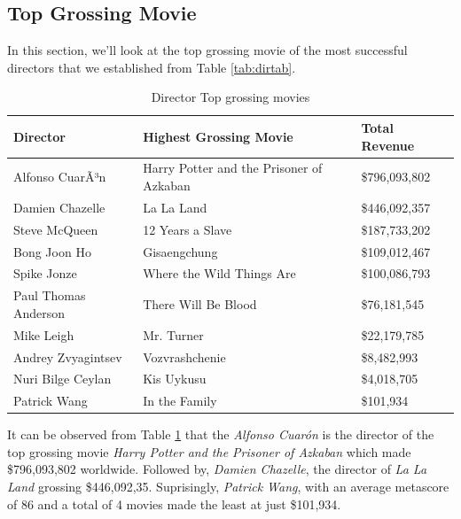 \documentclass[11pt,a4paper,]{article}
\begin{document}
\hypertarget{top-grossing-movie}{%
\subsection{Top Grossing Movie}\label{top-grossing-movie}}

In this section, we'll look at the top grossing movie of the most successful directors that we established from Table \ref{tab:dirtab}.

\begin{table}[!h]

\caption{\label{tab:dirtab2}Director Top grossing movies}
\centering
\begin{tabular}[t]{l|l|l}
\hline
Director & Highest Grossing Movie & Total Revenue\\
\hline
\rowcolor{gray!6}  Alfonso CuarÃ³n & Harry Potter and the Prisoner of Azkaban & \$796,093,802\\
\hline
Damien Chazelle & La La Land & \$446,092,357\\
\hline
\rowcolor{gray!6}  Steve McQueen & 12 Years a Slave & \$187,733,202\\
\hline
Bong Joon Ho & Gisaengchung & \$109,012,467\\
\hline
\rowcolor{gray!6}  Spike Jonze & Where the Wild Things Are & \$100,086,793\\
\hline
Paul Thomas Anderson & There Will Be Blood & \$76,181,545\\
\hline
\rowcolor{gray!6}  Mike Leigh & Mr. Turner & \$22,179,785\\
\hline
Andrey Zvyagintsev & Vozvrashchenie & \$8,482,993\\
\hline
\rowcolor{gray!6}  Nuri Bilge Ceylan & Kis Uykusu & \$4,018,705\\
\hline
Patrick Wang & In the Family & \$101,934\\
\hline
\end{tabular}
\end{table}

It can be observed from Table \ref{tab:dirtab2} that the \emph{Alfonso Cuarón} is the director of the top grossing movie \emph{Harry Potter and the Prisoner of Azkaban} which made \$796,093,802 worldwide. Followed by, \emph{Damien Chazelle}, the director of \emph{La La Land} grossing \$446,092,35. Suprisingly, \emph{Patrick Wang}, with an average metascore of 86 and a total of 4 movies made the least at just \$101,934.
\end{document}

